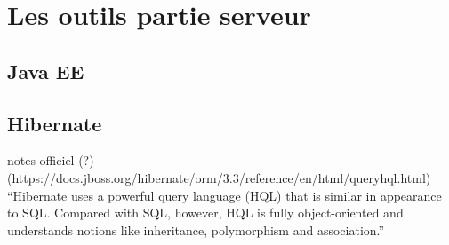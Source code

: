 \section{Les outils partie serveur}


\subsection{Java EE}


\subsection{Hibernate}
notes officiel (?)
(https://docs.jboss.org/hibernate/orm/3.3/reference/en/html/queryhql.html)\\

``Hibernate uses a powerful query language (HQL) that is similar in appearance to SQL. Compared with SQL, however, HQL is fully object-oriented and understands notions like inheritance, polymorphism and association.''
